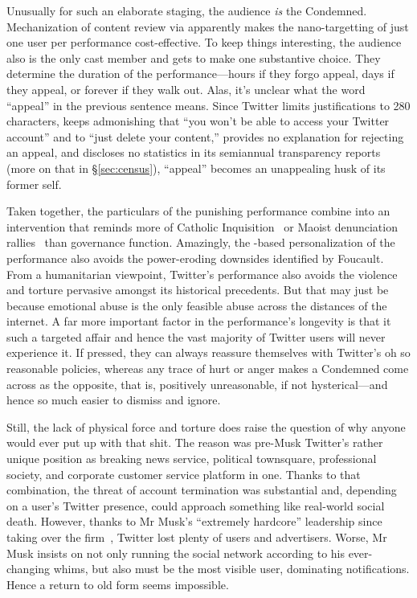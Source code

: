Unusually for such an elaborate staging, the audience \emph{is} the Condemned.
Mechanization of content review via  apparently makes the nano-targetting
of just one user per performance cost-effective. To keep things interesting, the
audience also is the only cast member and gets to make one substantive choice.
They determine the duration of the performance---hours if they forgo appeal,
days if they appeal, or forever if they walk out. Alas, it's unclear what the
word ``appeal'' in the previous sentence means. Since Twitter limits
justifications to 280 characters, keeps admonishing that ``you won't be able to
access your Twitter account'' and to ``just delete your content,'' provides no
explanation for rejecting an appeal, and discloses no statistics in its
semiannual transparency reports (more on that in \S\ref{sec:census}), ``appeal''
becomes an unappealing husk of its former self.

Taken together, the particulars of the punishing performance combine into an
intervention that reminds more of Catholic
Inquisition~\cite{Lea1906a,Lea1906b,Lea1906c,Lea1906d} or Maoist denunciation
rallies~\cite{Yang2021} than governance function. Amazingly, the -based
personalization of the performance also avoids the power-eroding downsides
identified by Foucault. From a humanitarian viewpoint, Twitter's performance
also avoids the violence and torture pervasive amongst its historical
precedents. But that may just be because emotional abuse is the only feasible
abuse across the distances of the internet. A far more important factor in the
performance's longevity is that it such a targeted affair and hence the vast
majority of Twitter users will never experience it. If pressed, they can always
reassure themselves with Twitter's oh so reasonable policies, whereas any trace
of hurt or anger makes a Condemned come across as the opposite, that is,
positively unreasonable, if not hysterical---and hence so much easier to dismiss
and ignore.

Still, the lack of physical force and torture does raise the question of why
anyone would ever put up with that shit. The reason was pre-Musk Twitter's
rather unique position as breaking news service, political townsquare,
professional society, and corporate customer service platform in one. Thanks to
that combination, the threat of account termination was substantial and,
depending on a user's Twitter presence, could approach something like real-world
social death. However, thanks to Mr Musk's ``extremely hardcore'' leadership
since taking over the firm~\cite{SchifferNewtonea2023}, Twitter lost plenty of
users and advertisers. Worse, Mr Musk insists on not only running the social
network according to his ever-changing whims, but also must be the most visible
user, dominating notifications. Hence a return to old form seems impossible.


